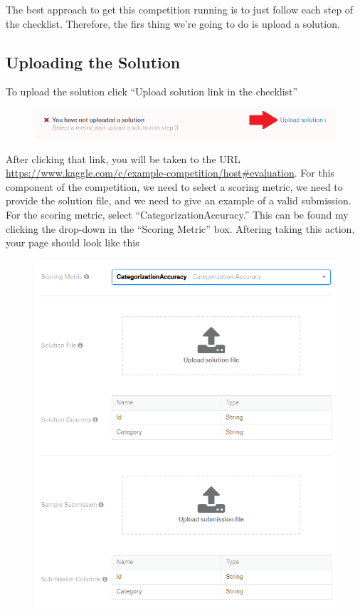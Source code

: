 \documentclass{article}
\begin{document}
The best approach to get this competition running is to just follow each
step of the checklist. Therefore, the firs thing we're going to do is
upload a solution.

\subsection{Uploading the Solution}\label{uploading-the-solution}

To upload the solution click ``Upload solution link in the checklist''

\begin{figure}[H]
    \centering
    \includegraphics[width=\linewidth]{figures/upload-solution-link.PNG}
\end{figure}

After clicking that link, you will be taken to the URL
\url{https://www.kaggle.com/c/example-competition/host\#evaluation}. For
this component of the competition, we need to select a scoring metric,
we need to provide the solution file, and we need to give an example of
a valid submission. For the scoring metric, select
``CategorizationAccuracy.'' This can be found my clicking the drop-down
in the ``Scoring Metric'' box. Aftering taking this action, your page
should look like this

\begin{figure}
    \centering
    \includegraphics[width=\linewidth]{figures/category-acc.PNG}
\end{figure}
\end{document}
